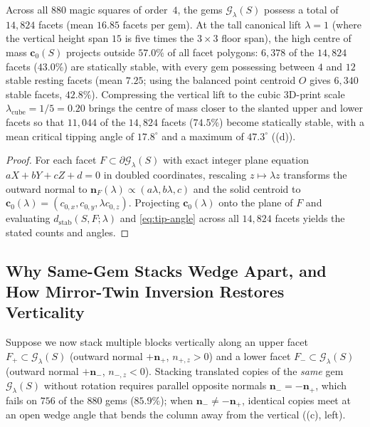\begin{proposition}
\label{prop:stability-census}
Across all $880$ magic squares of order~$4$, the gems $\mathcal G_\lambda(S)$ possess a total of $14{,}824$ facets (mean $16.85$ facets per gem). At the tall canonical lift $\lambda=1$ (where the vertical height span $15$ is five times the $3\times3$ floor span), the high centre of mass $\mathbf c_0(S)$ projects outside $57.0\%$ of all facet polygons: $6{,}378$ of the $14{,}824$ facets ($43.0\%$) are statically stable, with every gem possessing between $4$ and $12$ stable resting facets (mean $7.25$; using the balanced point centroid $O$ gives $6{,}340$ stable facets, $42.8\%$). Compressing the vertical lift to the cubic 3D-print scale $\lambda_{\mathrm{cube}}=1/5=0.20$ brings the centre of mass closer to the slanted upper and lower facets so that $11{,}044$ of the $14{,}824$ facets ($74.5\%$) become statically stable, with a mean critical tipping angle of $17.8^\circ$ and a maximum of $47.3^\circ$ ((d)).
\end{proposition}

\begin{proof}
For each facet $F\subset\partial\mathcal G_\lambda(S)$ with exact integer plane equation $aX+bY+cZ+d=0$ in doubled coordinates, rescaling $z\mapsto\lambda z$ transforms the outward normal to $\mathbf n_F(\lambda)\propto(a\lambda,b\lambda,c)$ and the solid centroid to $\mathbf c_0(\lambda)=(c_{0,x},c_{0,y},\lambda c_{0,z})$. Projecting $\mathbf c_0(\lambda)$ onto the plane of $F$ and evaluating $d_{\mathrm{stab}}(S,F;\lambda)$ and \eqref{eq:tip-angle} across all $14{,}824$ facets yields the stated counts and angles.
\end{proof}

\subsection{Why Same-Gem Stacks Wedge Apart, and How Mirror-Twin Inversion Restores Verticality}

Suppose we now stack multiple blocks vertically along an upper facet $F_+\subset\mathcal G_\lambda(S)$ (outward normal $+\mathbf n_+$, $n_{+,z}>0$) and a lower facet $F_-\subset\mathcal G_\lambda(S)$ (outward normal $+\mathbf n_-$, $n_{-,z}<0$). Stacking translated copies of the \emph{same} gem $\mathcal G_\lambda(S)$ without rotation requires parallel opposite normals $\mathbf n_-=-\mathbf n_+$, which fails on $756$ of the $880$ gems ($85.9\%$); when $\mathbf n_-\ne-\mathbf n_+$, identical copies meet at an open wedge angle that bends the column away from the vertical ((c), left).

